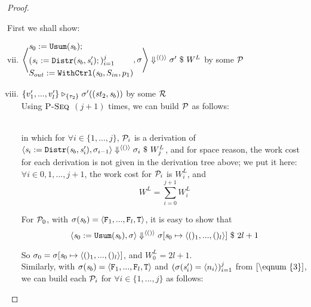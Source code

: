 \begin{proof}
\begin{itemize}
First we shall show: 
	\begin{enumerate}[(i)]
	\setcounter{enumi}{6}
	\item \label{comp-5} $\left\langle\begin{aligned} &\mathit{s}_0 := \mathtt{Usum}(\mathit{s}_b); \\ &(\mathit{s}_i := \mathtt{Distr}(\mathit{s}_b,\mathit{s}_i');)^j_{i=1} \\ &S_{out} := \mathtt{WithCtrl}(\mathit{s}_0,S_{in},p_1) \end{aligned},\sigma \right\rangle \Downarrow^{\langle () \rangle} \sigma' \ \$ \ W^L$
	by some $\mathcal{P}$
	\item $\{ v'_1,...,v'_l \} \mathrel{\triangleright_{\{\tau_2\}}} \sigma'((\mathit{st}_2,\mathit{s}_b))$ by some $\mathcal{R}$ \\

Using $\textsc{P-Seq}$ $(j+1)$ times, we can build $\mathcal{P}$ as follows:

{\normalsize
{}}\\

 in which for $\forall i \in \{1,...,j\}$, $\mathcal{P}_i$ is a derivation of  $\left\langle\mathit{s}_i := \mathtt{Distr}(\mathit{s}_b,\mathit{s}_i'),\sigma_{i-1} \right\rangle \Downarrow^{\langle () \rangle} \sigma_{i} \ \$ \ W^L_j$,
 and for space reason, the work cost for each derivation is not given in the derivation tree above; we put it here: $\forall i \in {0,1,...,j+1}$, the work cost for $\mathcal{P}_i$ is $W^L_i$,
 and $$W^L = \sum_{i=0}^{j+1} W^L_i$$
 

 
  For $\mathcal{P}_0$, with $\sgm(\s_b) = \stwo$, it is easy to show that
  $$\seval{\usumdef}{\sgm}{\vunit}{\sgm[\s_0 \|-> \lunit]}{2l+1}$$
  

    So $\sgm_0 = \sgm[\s_0 \|-> \lunit]$, and $W^L_0 = 2l+1$.\\

	Similarly, with  $\sgm(\s_b) = \stwo$ and $(\sigma(\mathit{s}_i') = \langle n_i \rangle)^j_{i=1}$ from $\eqref{\eqnum{3}}$, we can build each $\mathcal{P}_i$ for 
	$\forall i \in \{1,...,j\}$ as follows:\\
	
  

\end{enumerate}
\end{itemize}
\end{proof}
